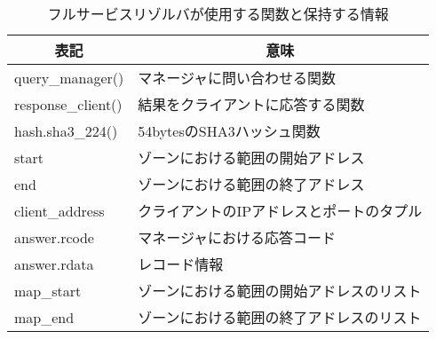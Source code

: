 \begin{table}[htb]
 \caption{フルサービスリゾルバが使用する関数と保持する情報}
 \centering
  \begin{tabular}{ll}
    \toprule
		\multicolumn{1}{c}{\textbf{表記}} & \multicolumn{1}{c}{\textbf{意味}} \\
    \midrule
		query\_manager() & マネージャに問い合わせる関数 \\
		response\_client() & 結果をクライアントに応答する関数 \\
		hash.sha3\_224() & 54bytesのSHA3ハッシュ関数 \\
    start & ゾーンにおける範囲の開始アドレス \\
    end & ゾーンにおける範囲の終了アドレス \\
    client\_address & クライアントのIPアドレスとポートのタプル \\
		answer.rcode & マネージャにおける応答コード \\
		answer.rdata & レコード情報 \\
    map\_start & ゾーンにおける範囲の開始アドレスのリスト \\
    map\_end & ゾーンにおける範囲の終了アドレスのリスト \\
    \bottomrule
  \end{tabular}
 \label{tab:discription-fullresolv}
\end{table}
